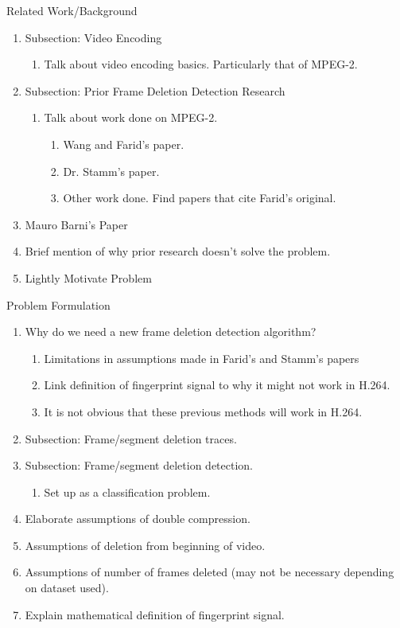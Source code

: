 \documentclass[12pt]{article}%
\def\be{\begin{enumerate}    %
\vspace{-0.5em}\setlength\itemsep{0em}}
\begin{document}
  \item Related Work/Background
  \be
    \item Subsection: Video Encoding
    \be      
      \item Talk about video encoding basics. Particularly that of MPEG-2.
    \end{enumerate}
    \item Subsection: Prior Frame Deletion Detection Research
    \be
      \item Talk about work done on MPEG-2.
      \be
        \item Wang and Farid's paper.
        \item Dr. Stamm's paper.
        \item Other work done. Find papers that cite Farid's original.
      \end{enumerate}
    \end{enumerate}
    \item Mauro Barni's Paper
    \item Brief mention of why prior research doesn't solve the problem.
    \item Lightly Motivate Problem
  \end{enumerate}
  
  \item Problem Formulation
  \be
    \item Why do we need a new frame deletion detection algorithm?
    \be
      \item Limitations in assumptions made in Farid's and Stamm's papers
      \item Link definition of fingerprint signal to why it might not work in H.264.
      \item It is not obvious that these previous methods will work in H.264.
    \end{enumerate}
    \item Subsection: Frame/segment deletion traces.
    \item Subsection: Frame/segment deletion detection.
    \be
      \item Set up as a classification problem.
    \end{enumerate}
    \item Elaborate assumptions of double compression.
    \item Assumptions of deletion from beginning of video.
    \item Assumptions of number of frames deleted (may not be necessary depending on dataset used).
    \item Explain mathematical definition of fingerprint signal.
  \end{enumerate}  
  
\end{document}
